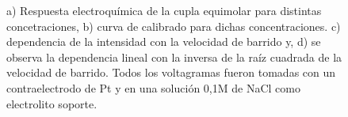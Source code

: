 {\begin{figure}[ht]
\begin{subfigure}[t]{0.495\textwidth}
         		\label{fig:Fe_d}
     			\end{subfigure}
     		 \caption[Respuesta electroquímica para \fe]{a) Respuesta electroquímica de la cupla equimolar \fe\space para distintas concetraciones, b) curva de calibrado para dichas concentraciones. c) dependencia de la intensidad con la velocidad de barrido y, d) se observa la dependencia lineal con la inversa de la raíz cuadrada de la velocidad de barrido. Todos los voltagramas fueron tomadas con un contraelectrodo de Pt y en una solución 0,1M de NaCl como electrolito soporte.}
     		 \label{fig:ferro-ferri-CV}
     		 \end{figure}
		
			\pagebreak	

}
